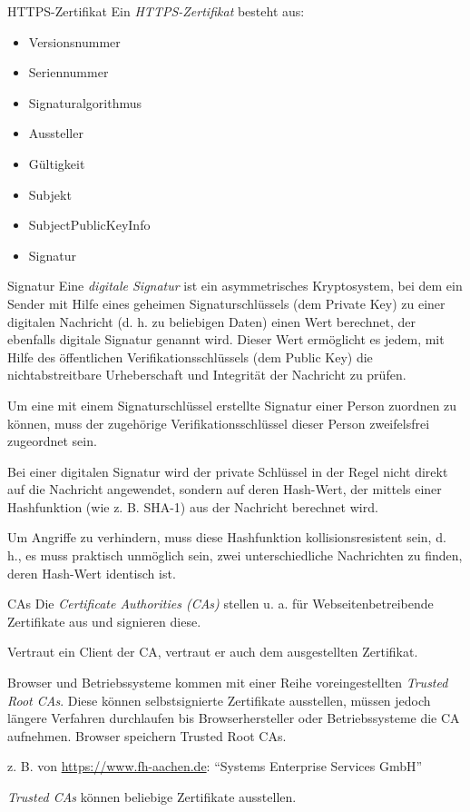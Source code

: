 \begin{defi}{HTTPS-Zertifikat}
    Ein \emph{HTTPS-Zertifikat} besteht aus:
    \begin{itemize}
        \item Versionsnummer
        \item Seriennummer
        \item Signaturalgorithmus
        \item Aussteller
        \item Gültigkeit
        \item Subjekt
        \item SubjectPublicKeyInfo
        \item Signatur
    \end{itemize}
\end{defi}

\begin{defi}{Signatur}
    Eine \emph{digitale Signatur} ist ein asymmetrisches Kryptosystem, bei dem ein Sender mit Hilfe eines geheimen Signaturschlüssels (dem Private Key) zu einer digitalen Nachricht (d. h. zu beliebigen Daten) einen Wert berechnet, der ebenfalls digitale Signatur genannt wird.
    Dieser Wert ermöglicht es jedem, mit Hilfe des öffentlichen Verifikationsschlüssels (dem Public Key) die nichtabstreitbare Urheberschaft und Integrität der Nachricht zu prüfen.

    Um eine mit einem Signaturschlüssel erstellte Signatur einer Person zuordnen zu können, muss der zugehörige Verifikationsschlüssel dieser Person zweifelsfrei zugeordnet sein.

    Bei einer digitalen Signatur wird der private Schlüssel in der Regel nicht direkt auf die Nachricht angewendet, sondern auf deren Hash-Wert, der mittels einer Hashfunktion (wie z. B. SHA-1) aus der Nachricht berechnet wird.

    Um Angriffe zu verhindern, muss diese Hashfunktion kollisionsresistent sein, d. h., es muss praktisch unmöglich sein, zwei unterschiedliche Nachrichten zu finden, deren Hash-Wert identisch ist.
\end{defi}

\begin{bonus}{CAs}
    Die \emph{Certificate Authorities (CAs)} stellen u. a. für Webseitenbetreibende Zertifikate aus und signieren diese.

    Vertraut ein Client der CA, vertraut er auch dem ausgestellten Zertifikat.

    Browser und Betriebssysteme kommen mit einer Reihe voreingestellten \emph{Trusted Root CAs}.
    Diese können selbstsignierte Zertifikate ausstellen, müssen jedoch längere Verfahren durchlaufen bis Browserhersteller oder Betriebssysteme die CA aufnehmen.
    Browser speichern Trusted Root CAs.

    z. B. von \href{https://www.fh-aachen.de}{https://www.fh-aachen.de}: \enquote{Systems Enterprise Services GmbH}

    \emph{Trusted CAs} können beliebige Zertifikate ausstellen.
\end{bonus}

